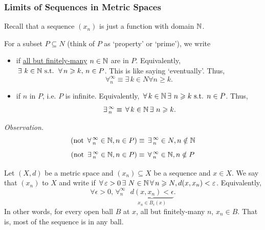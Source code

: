 \documentclass[14pt,oneside]{extarticle}
\begin{document}
\subsubsection{Limits of Sequences in Metric Spaces}
Recall that a sequence $(x_n)$ is just a function with domain $\mathbb{N}$.

\begin{notation*}
  For a subset $P \subseteq N$ (think of $P$ as `property' or `prime'), we write
  \begin{itemize}[label=$\to$,nosep]
    \item {} if \underline{all but finitely-many} $n \in \mathbb{N}$ are in $P$. Equivalently, $\exists \, k \in \N \text{ s.t. } \forall n \geq k, \, n \in P$. This is like saying `eventually'. Thus, 
    \[\forall^\infty_n \equiv \exists \, k \in N \forall n \geq k. \]
    \item {} if  $n$ in $P$, i.e. $P$ is infinite. Equivalently, $\forall k \in \N \exists \, n \geq k \text{ s.t. } n \in P$. Thus,
    \[\exists^\infty_n \equiv \forall k \in \N \exists \, n \geq k. \]
  \end{itemize}
\end{notation*}

\textit{Observation.}
\[(\text{not } \forall^\infty_n \in \N, n \in P) \equiv \exists^\infty_n \in N, n \notin \N\]
\[(\text{not } \exists^\infty_n \in \N, n \in P) \equiv \forall^\infty_n \in \N, n \notin P\]

\begin{definition*}
  Let $(X,d)$ be a metric space and $(x_n) \subseteq X$ be a sequence and $x \in X$. We say that $(x_n)$  to $X$ and write  if $\forall \epsilon > 0 \exists \, N \in \N \forall n \geq N, d(x,x_n) < \epsilon$. Equivalently, 
  \[\forall \epsilon > 0 \text{, } \forall^\infty_n \text{ } \underbrace{d(x, x_n) < \epsilon}_{x_n \in B_\epsilon(x)}.\]
  In other words, for every open ball $B$ at $x$, all but finitely-many $n$, $x_n \in B$. That is, most of the sequence is in any ball.
\end{definition*}
\end{document}
